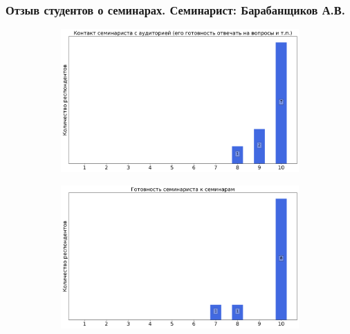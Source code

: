     \subsubsection{Отзыв студентов о семинарах. Семинарист: Барабанщиков А.В.}
		\begin{figure}[H]
			\centering
			\begin{subfigure}[b]{0.45\textwidth}
				\centering
				\includegraphics[width=\textwidth]{images/2 course/Кратные интегралы и теория поля/seminarists-marks-Барабанщиков А.В.-0.png}
			\end{subfigure}
			\begin{subfigure}[b]{0.45\textwidth}
				\centering
				\includegraphics[width=\textwidth]{images/2 course/Кратные интегралы и теория поля/seminarists-marks-Барабанщиков А.В.-1.png}
			\end{subfigure}
			\begin{subfigure}[b]{0.45\textwidth}
				\centering

\end{subfigure}
\end{figure}
